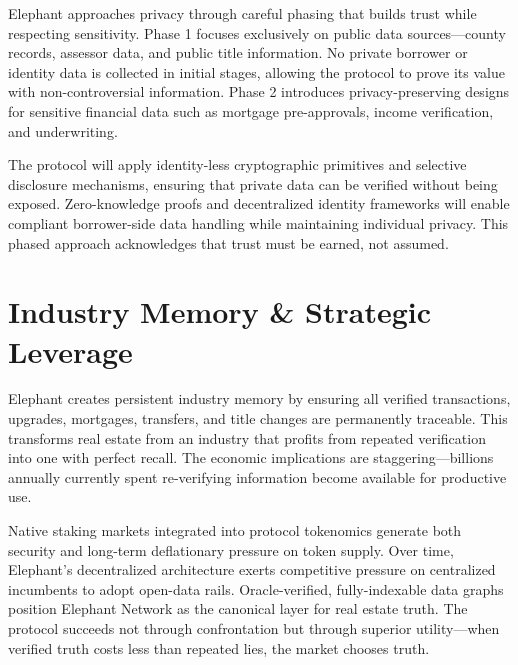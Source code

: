 Elephant approaches privacy through careful phasing that builds trust while respecting sensitivity. Phase 1 focuses exclusively on public data sources—county records, assessor data, and public title information. No private borrower or identity data is collected in initial stages, allowing the protocol to prove its value with non-controversial information. Phase 2 introduces privacy-preserving designs for sensitive financial data such as mortgage pre-approvals, income verification, and underwriting.

The protocol will apply identity-less cryptographic primitives and selective disclosure mechanisms, ensuring that private data can be verified without being exposed. Zero-knowledge proofs and decentralized identity frameworks will enable compliant borrower-side data handling while maintaining individual privacy. This phased approach acknowledges that trust must be earned, not assumed.

\section{Industry Memory \& Strategic Leverage}

Elephant creates persistent industry memory by ensuring all verified transactions, upgrades, mortgages, transfers, and title changes are permanently traceable. This transforms real estate from an industry that profits from repeated verification into one with perfect recall. The economic implications are staggering—billions annually currently spent re-verifying information become available for productive use.

Native staking markets integrated into protocol tokenomics generate both security and long-term deflationary pressure on token supply. Over time, Elephant's decentralized architecture exerts competitive pressure on centralized incumbents to adopt open-data rails. Oracle-verified, fully-indexable data graphs position Elephant Network as the canonical layer for real estate truth. The protocol succeeds not through confrontation but through superior utility—when verified truth costs less than repeated lies, the market chooses truth.